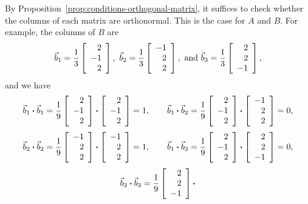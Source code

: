\documentclass{ximera}
\begin{document}
\begin{solution}
  By Proposition~\ref{prop:conditions-orthogonal-matrix}, it suffices to check
  whether the columns of each matrix are orthonormal. This is the case
  for $A$ and $B$. For example, the columns of $B$ are
  \begin{equation*}
    \vect{b}_1 = \frac{1}{3}\startmat{r} 2 \\ -1 \\ 2 \stopmat,
    \quad
    \vect{b}_2 = \frac{1}{3}\startmat{r} -1 \\ 2 \\ 2 \stopmat,
    \quad\mbox{and}\quad
    \vect{b}_3 = \frac{1}{3}\startmat{r} 2 \\ 2 \\ -1 \stopmat,
  \end{equation*}
  and we have
  \begin{equation*}
    \vect{b}_1\dotprod \vect{b}_1 =
    \frac{1}{9}
    \startmat{r} 2 \\ -1 \\ 2 \stopmat
    \dotprod
    \startmat{r} 2 \\ -1 \\ 2 \stopmat
    = 1,\qquad
    \vect{b}_1\dotprod \vect{b}_2 =
    \frac{1}{9}
    \startmat{r} 2 \\ -1 \\ 2 \stopmat
    \dotprod
    \startmat{r} -1 \\ 2 \\ 2 \stopmat
    = 0,
  \end{equation*}
  \begin{equation*}
    \vect{b}_2\dotprod \vect{b}_2 =
    \frac{1}{9}
    \startmat{r} -1 \\ 2 \\ 2 \stopmat
    \dotprod
    \startmat{r} -1 \\ 2 \\ 2 \stopmat
    = 1,\qquad
    \vect{b}_1\dotprod \vect{b}_3 =
    \frac{1}{9}
    \startmat{r} 2 \\ -1 \\ 2 \stopmat
    \dotprod
    \startmat{r} 2 \\ 2 \\ -1 \stopmat
    = 0,
  \end{equation*}
  \begin{equation*}
    \vect{b}_3\dotprod \vect{b}_3 =
    \frac{1}{9}
    \startmat{r} 2 \\ 2 \\ -1 \stopmat
    \dotprod

\end{equation*}
\end{solution}
\end{document}
